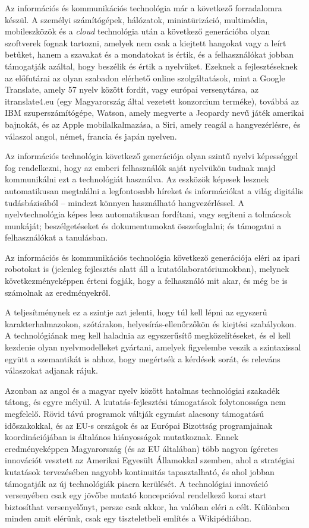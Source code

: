\begin{multicols}{2}
  Az információs és kommunikációs technológia már a következő forradalomra ké\-szül. A személyi számítógépek, hálózatok, miniatürizáció, multimédia, mobileszközök és a \textit{cloud} technológia után a következő generációba olyan szoftverek fognak tartozni, amelyek nem csak a kiejtett hangokat vagy a leírt betűket, hanem a szavakat és a mondatokat is értik, és a felhasználókat jobban támogatják azáltal, hogy beszélik és értik a nyelvüket. Ezeknek a fejlesztéseknek az előfutárai az olyan szabadon elérhető online szolgáltatások, mint a Google Translate, amely 57 nyelv között fordít, vagy európai versenytársa, az itranslate4.eu (egy Magyarország által vezetett konzorcium terméke), továbbá az IBM szuperszámítógépe, Watson, amely megverte a Jeopardy nevű játék amerikai bajnokát, és az Apple mobilalkalmazása, a Siri, amely reagál a hangvezérlésre, és válaszol angol, német, francia és japán nyelven.  

  Az információs technológia következő generációja olyan szintű nyelvi képességgel fog rendelkezni, hogy az emberi felhasználók saját nyelvükön tudnak majd kommunikálni ezt a technológiát használva. Az eszközök képesek lesznek automatikusan megtalálni a legfontosabb híreket és információkat a világ digitális tudásbázisából -- mindezt könnyen használható hangvezérléssel. A nyelvtechnológia képes lesz auto\-ma\-ti\-ku\-san fordítani, vagy segíteni a tolmácsok munkáját; beszélgetéseket és dokumentumokat összefoglalni; és támogatni a felhasználókat a tanulásban. 

  Az információs és kommunikációs technológia következő generációja eléri az ipari robotokat is (jelenleg fejlesztés alatt áll a kutatólaboratóriumokban), melynek kö\-vet\-kez\-mé\-nye\-kép\-pen érteni fogják, hogy a felhasználó mit akar, és még be is számolnak az eredményekről. 

  A teljesítménynek ez a szintje azt jelenti, hogy túl kell lépni az egyszerű karakterhalmazokon, szótárakon, helyesírás-ellenőrzőkön és kiejtési szabályokon. A technológiának meg kell haladnia az egyszerűsítő megközelítéseket, és el kell kezdenie olyan nyelvmodelleket gyártani, amelyek figyelembe veszik a szintaxissal együtt a szemantikát is ahhoz, hogy megértsék a kérdések sorát, és releváns válaszokat adjanak rájuk. 

  Azonban az angol és a magyar nyelv között hatalmas technológiai szakadék tátong, és egyre mélyül. A kutatás-fejlesztési támogatások foly\-to\-nos\-sá\-ga nem megfelelő. Rövid távú prog\-ra\-mok váltják egymást alacsony támogatású időszakokkal, és az EU-s országok és az Európai Bizottság programjainak koordinációjában is általános hiá\-nyos\-sá\-gok mutatkoznak. Ennek eredményeképpen Magyarország (és az EU általában) több nagyon ígéretes innovációt vesztett az Amerikai Egyesült Államokkal szemben, ahol a stratégiai kutatások tervezésében nagyobb kontinuitás tapasztalható, és ahol jobban támogatják az új technológiák piacra kerülését. A technológiai innováció versenyében csak egy jövőbe mutató koncepcióval rendelkező korai start biztosíthat versenyelőnyt, persze csak akkor, ha valóban eléri a célt. Különben minden amit elérünk, csak egy tiszteletbeli említés a Wikipédiában. 


\end{multicols}
